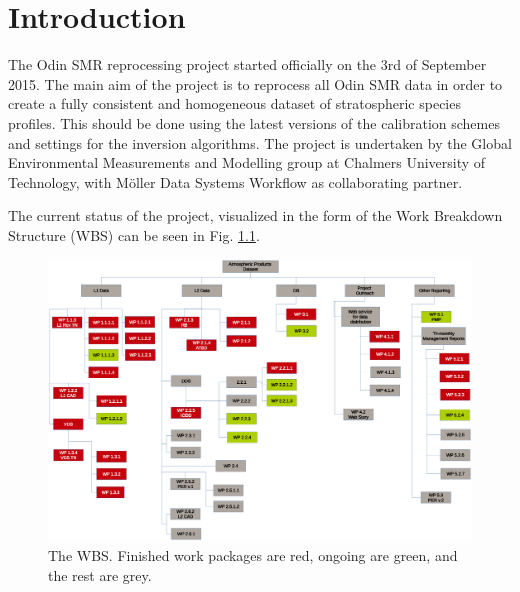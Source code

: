 \chapter{Introduction}
\label{chapter:introduction}

\setcounter{page}{1}


The Odin SMR reprocessing project started officially on the 3rd of September 2015. The main aim of the project is to reprocess all Odin SMR data in order to create a fully consistent and homogeneous dataset of stratospheric species profiles. This should be done using the latest versions of the calibration schemes and settings for the inversion algorithms. The project is undertaken by the Global Environmental Measurements and Modelling group at Chalmers University of Technology, with M\"oller Data Systems Workflow as collaborating partner.   

The current status of the project, visualized in the form of the Work Breakdown Structure (WBS) can be seen in Fig. \ref{fig:WBS}.

\begin{figure}[t]
\centering
\includegraphics[scale = 0.5]{figures/wbsTMMR4.eps}
\caption{The WBS. Finished work packages are red, ongoing are green, and the rest are grey.}
\label{fig:WBS}
\end{figure}

